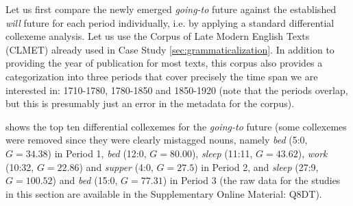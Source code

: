 Let us first compare the newly emerged \textit{going\hyp{}to}  future against the established \textit{will} future for each period individually, i.e. by applying a standard differential collexeme  analysis. Let us use the Corpus of Late Modern English Texts (CLMET)  already used in Case Study \ref{sec:grammaticalization}. In addition to providing the year of publication for most texts, this corpus also provides a categorization  into three periods that cover precisely the time span we are interested in: 1710-1780, 1780-1850 and 1850-1920 (note that the periods overlap, but this is presumably just an error in the metadata  for the corpus).

 shows the top ten differential collexemes  for the \textit{going\hyp{}to}  future (some collexemes were removed since they were clearly mistagged nouns,  namely \textit{bed} (5:0, $G = 34.38$) in Period 1, \textit{bed} (12:0, $G = 80.00$), \textit{sleep} (11:11, $G = 43.62$), \textit{work} (10:32, $G = 22.86$) and \textit{supper} (4:0, $G = 27.5$) in Period 2, and \textit{sleep} (27:9, $G = 100.52$) and \textit{bed} (15:0, $G = 77.31$) in Period 3 (the raw data for the studies in this section are available in the Supplementary Online Material: Q8DT).

